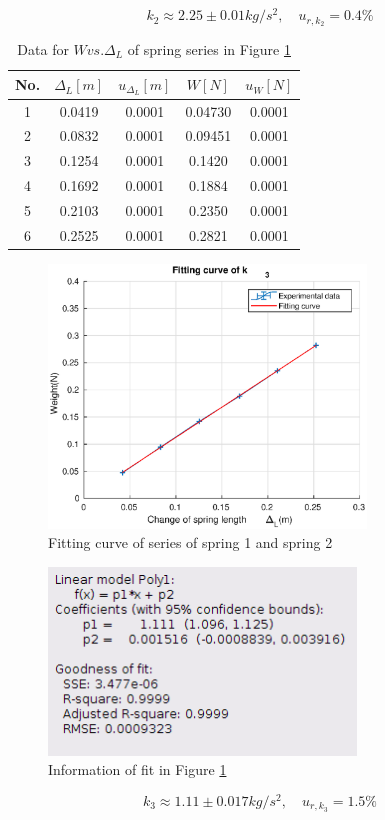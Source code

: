    \[
        k_2\approx 2.25\pm 0.01kg/s^2, \quad u_{r,k_2}=0.4\%
    \]
    \begin{table}[!ht] \small
        \centering
        \begin{tabular}{|c|c|c|c|c|}
            \hline
            No. & $\Delta_L[m]$ & $u_{\Delta_L}[m]$ & $W[N]$ & $u_{W}[N]$\\ \hline
            1 & 0.0419 & 0.0001 & 0.04730 & 0.0001\\ \hline
            2 & 0.0832 & 0.0001 & 0.09451 & 0.0001\\ \hline
            3 & 0.1254 & 0.0001 & 0.1420 & 0.0001\\ \hline
            4 & 0.1692 & 0.0001 & 0.1884 & 0.0001\\ \hline
            5 & 0.2103 & 0.0001 & 0.2350 & 0.0001\\ \hline
            6 & 0.2525 & 0.0001 & 0.2821 & 0.0001\\ \hline
        \end{tabular}
        \caption{Data for $W vs. \Delta_L$ of spring series in Figure \ref{k_3}}\label{k3data}
    \end{table}
    \newpage
    \begin{figure}[h]
        \centering    
        \includegraphics[height=7cm]{images/k3.eps}
        \caption{Fitting curve of series of spring 1 and spring 2}\label{k_3}
    \end{figure}
    \begin{figure}[!h]
        \centering
        \includegraphics[height=5cm]{images/k3info.png}
        \caption{Information of fit in Figure \ref{k_3}}\label{k3info}
    \end{figure}
    \[
        k_3\approx 1.11\pm 0.017kg/s^2, \quad u_{r,k_3}=1.5\%
    \]

